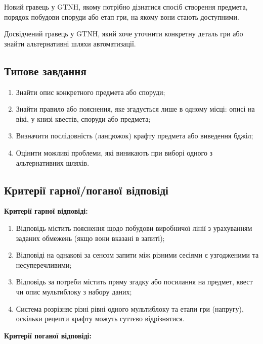 Новий гравець у GTNH, якому потрібно дізнатися спосіб створення предмета, порядок побудови споруди або етап гри, на якому вони стають доступними.

Досвідчений гравець у GTNH, який хоче уточнити конкретну деталь гри або знайти альтернативні шляхи автоматизації.

\subsection{Типове завдання}

\begin{enumerate}[wide,beginpenalty=10000]
    \item Знайти опис конкретного предмета або споруди;
    \item Знайти правило або пояснення, яке згадується лише в одному місці: описі на вікі, у книзі квестів, споруди або предмета;
    \item Визначити послідовність (ланцюжок) крафту предмета або виведення бджіл;
    \item Оцінити можливі проблеми, які виникають при виборі одного з альтернативних шляхів.
\end{enumerate}

\subsection{Критерії гарної/поганої відповіді}

\textbf{Критерії гарної відповіді:}

\begin{enumerate}[wide,beginpenalty=10000]
    \item Відповідь містить пояснення щодо побудови виробничої лінії з урахуванням заданих обмежень (якщо вони вказані в запиті);
    \item Відповіді на однакові за сенсом запити між різними сесіями є узгодженими та несуперечливими;
    \item Відповідь за потреби містить пряму згадку або посилання на предмет, квест чи опис мультиблоку з набору даних;
    \item Система розрізняє різні рівні одного мультиблоку та етапи гри (напругу), оскільки рецепти крафту можуть суттєво відрізнятися.
\end{enumerate}

\textbf{Критерії поганої відповіді:}

